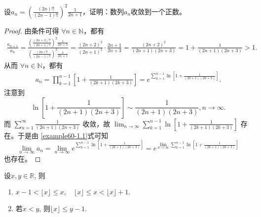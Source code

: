\documentclass[../../main.tex]{subfiles}%
\begin{document}
\begin{example}
设\(a_n=\left(\frac{(2n)!!}{(2n - 1)!!}\right)^2\frac{1}{2n + 1}\)，证明：数列\(a_n\)收敛到一个正数。
\end{example}
\begin{proof}
由条件可得 \(\forall n\in \mathbb{N}\)，都有
\begin{align*}
\frac{a_{n+1}}{a_n}=\frac{\left( \frac{(2n+2)!!}{(2n+1)!!} \right) ^2\frac{1}{2n+3}}{\left( \frac{(2n)!!}{(2n-1)!!} \right) ^2\frac{1}{2n+1}}=\frac{\left( 2n+2 \right) ^2}{\left( 2n+1 \right) ^2}\cdot \frac{2n+1}{2n+3}=\frac{\left( 2n+2 \right) ^2}{\left( 2n+1 \right) \left( 2n+3 \right)}=1+\frac{1}{\left( 2n+1 \right) \left( 2n+3 \right)}>1.
\end{align*}
从而 \(\forall n\in \mathbb{N}\)，都有
\begin{align}
a_n=\prod_{k = 1}^{n - 1}\left[1+\frac{1}{(2k + 1)(2k + 3)}\right]=e^{\sum\limits_{k = 1}^{n - 1}\ln\left[1+\frac{1}{(2k + 1)(2k + 3)}\right]}. \label{example60-1.1}
\end{align}
注意到
\[
\ln\left[1+\frac{1}{(2n + 1)(2n + 3)}\right]\sim\frac{1}{(2n + 1)(2n + 3)},n\rightarrow\infty.
\]
而 \(\sum_{n = 1}^{\infty}\frac{1}{(2n + 1)(2n + 3)}\) 收敛，故 \(\lim_{n\rightarrow\infty}\sum_{k = 1}^{n - 1}\ln\left[1+\frac{1}{(2k + 1)(2k + 3)}\right]\) 存在。于是由 \eqref{example60-1.1}式可知
\[
\lim_{n\rightarrow\infty}a_n=\lim_{n\rightarrow\infty}e^{\sum\limits_{k = 1}^{n - 1}\ln\left[1+\frac{1}{(2k + 1)(2k + 3)}\right]}=e^{\lim\limits_{n\rightarrow\infty}\sum\limits_{k = 1}^{n - 1}\ln\left[1+\frac{1}{(2k + 1)(2k + 3)}\right]}
\]
也存在。
\end{proof}

\begin{proposition}[取整函数的基本性质]\label{proposition:取整函数的基本性质}
设$x,y\in \mathbb{R}$, 则
\begin{enumerate}[(1)]
\item $x-1<\lfloor x \rfloor \leqslant x,\quad \lfloor x \rfloor \leqslant x<\lfloor x \rfloor +1.$
\item 若$x<y$, 则$\lfloor x \rfloor \leqslant y-1.$
\end{enumerate}
\end{proposition}
\end{document}
